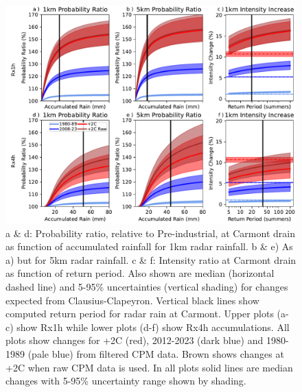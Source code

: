 \documentclass[11pt,a4paper]{article}
\begin{document}
\clearpage
\begin{figure}[ht!]
	\centering
	\includegraphics[width=0.9\linewidth]{intens_prob_ratios}
	\caption{a \& d: Probability ratio, relative to Pre-industrial, at Carmont drain as function of accumulated rainfall for 1km radar rainfall. b \& e) As a) but for 5km radar rainfall. c \& f: Intensity ratio at Carmont drain  as function of  return period. Also shown are median (horizontal dashed line) and 5-95\% uncertainties (vertical shading) for changes expected from Clausius-Clapeyron. Vertical black lines show computed return period for radar rain at Carmont. Upper plots (a-c) show Rx1h  while lower plots (d-f) show Rx4h accumulations. All plots show changes for +2C (red), 2012-2023 (dark blue) and 1980-1989 (pale blue) from filtered CPM data. Brown shows changes at +2C  when raw CPM data is used.   In all plots solid lines are median changes with 5-95\% uncertainty range shown by  shading.}
	\label{fig:intense_prob_ratios}
\end{figure}
\clearpage
\end{document}
